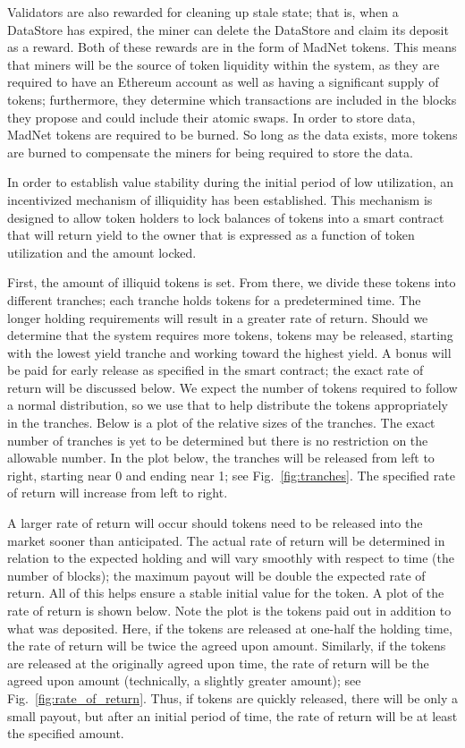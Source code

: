 Validators are also rewarded for cleaning up stale state;
that is, when a DataStore has expired, the miner can delete the
DataStore and claim its deposit as a reward.
Both of these rewards are in the form of MadNet tokens.
This means that miners will be the source of token liquidity
within the system, as they are required to have an Ethereum account
as well as having a significant supply of tokens;
furthermore, they determine which transactions are included
in the blocks they propose and could include their atomic swaps.
In order to store data, MadNet tokens are required to be burned.
So long as the data exists, more tokens are burned to compensate
the miners for being required to store the data.

In order to establish value stability during the initial period of low
utilization, an incentivized mechanism of illiquidity has been
established.
This mechanism is designed to allow token holders to lock balances of
tokens into a smart contract that will return yield to the owner that
is expressed as a function of token utilization and the amount locked.

First, the amount of illiquid tokens is set.
From there, we divide these tokens into different tranches; each
tranche holds tokens for a predetermined time.
The longer holding requirements will result in a greater rate of return.
Should we determine that the system requires more tokens, tokens may be
released, starting with the lowest yield tranche and working toward the
highest yield.
A bonus will be paid for early release as specified in the smart
contract; the exact rate of return will be discussed below.
We expect the number of tokens required to follow a normal
distribution, so we use that to help distribute the tokens
appropriately in the tranches.
Below is a plot of the relative sizes of the tranches.
The exact number of tranches is yet to be determined but there is no
restriction on the allowable number.
In the plot below, the tranches will be released from left to right,
starting near 0 and ending near 1; see Fig.~\ref{fig:tranches}.
The specified rate of return will increase from left to right.



A larger rate of return will occur should tokens need to be released
into the market sooner than anticipated.
The actual rate of return will be determined in relation to the
expected holding and will vary smoothly with respect to time (the
number of blocks); the maximum payout will be double the expected rate
of return.
All of this helps ensure a stable initial value for the token.
A plot of the rate of return is shown below.
Note the plot is the tokens paid out in addition to what was deposited.
Here, if the tokens are released at one-half the holding time, the rate
of return will be twice the agreed upon amount.
Similarly, if the tokens are released at the originally agreed upon
time, the rate of return will be the agreed upon amount (technically, a
slightly greater amount); see Fig.~\ref{fig:rate_of_return}.
Thus, if tokens are quickly released, there will be only a small
payout, but after an initial period of time, the rate of return will be
at least the specified amount.


